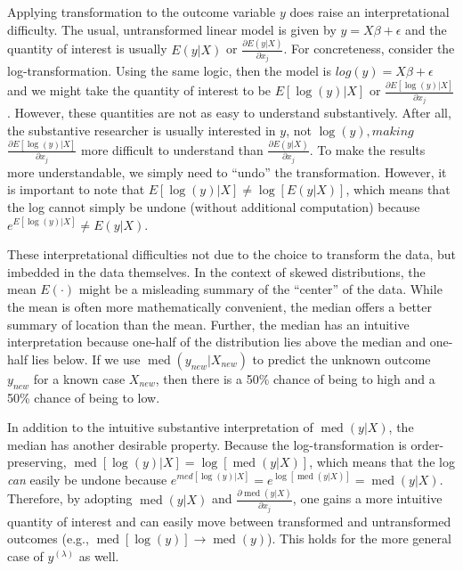 \documentclass[12pt]{article}
\DeclareMathOperator{\med}{med}
\begin{document}
Applying transformation to the outcome variable $y$ does raise an interpretational difficulty. The usual, untransformed linear model is given by $y = X\beta + \epsilon$ and the quantity of interest is usually $E(y | X)$ or $\frac{\partial E(y | X)}{\partial x_j}$. For concreteness, consider the log-transformation. Using the same logic, then the model is $log(y) = X\beta + \epsilon$ and we might take the quantity of interest to be $E[\log(y) | X]$ or $\frac{\partial E[\log(y) | X]}{\partial x_j}$. However, these quantities are not as easy to understand substantively. After all, the substantive researcher is usually interested in $y$, not $\log(y), making $$\frac{\partial E[\log(y) | X]}{\partial x_j}$ more difficult to understand than $\frac{\partial E(y | X)}{\partial x_j}$. To make the results more understandable, we simply need to ``undo'' the transformation. However, it is important to note that $E[\log(y) | X] \neq \log [E(y | X)]$, which means that the log cannot simply be undone (without additional computation) because $e^{E[\log(y) | X]} \neq E(y | X)$. 

These interpretational difficulties not due to the choice to transform the data, but imbedded in the data themselves. In the context of skewed distributions, the mean $E(\cdot)$ might be a misleading summary of the ``center'' of the data. While the mean is often more mathematically convenient, the median offers a better summary of location than the mean. Further, the median has an intuitive interpretation because one-half of the distribution lies above the median and one-half lies below. If we use $\med(y_{new} | X_{new})$ to predict the unknown outcome $y_{new}$ for a known case $X_{new}$, then there is a 50\% chance of being to high and a 50\% chance of being to low. 

In addition to the intuitive substantive interpretation of $\med(y | X)$, the median has another desirable property. Because the log-transformation is order-preserving, $\med[\log(y) | X] = \log [\med(y | X)]$, which means that the log \textit{can} easily be undone because $e^{med[\log(y) | X]} = e^{\log[\med(y | X)]} = \med(y | X)$. Therefore, by adopting $\med(y | X)$ and $\frac{\partial \med(y | X)}{\partial x_j}$, one gains a more intuitive quantity of interest and can easily move between transformed and untransformed outcomes (e.g., $\med[\log(y)] \rightarrow \med(y)$). This holds for the more general case of $y^{(\lambda)}$ as well.
\end{document}
